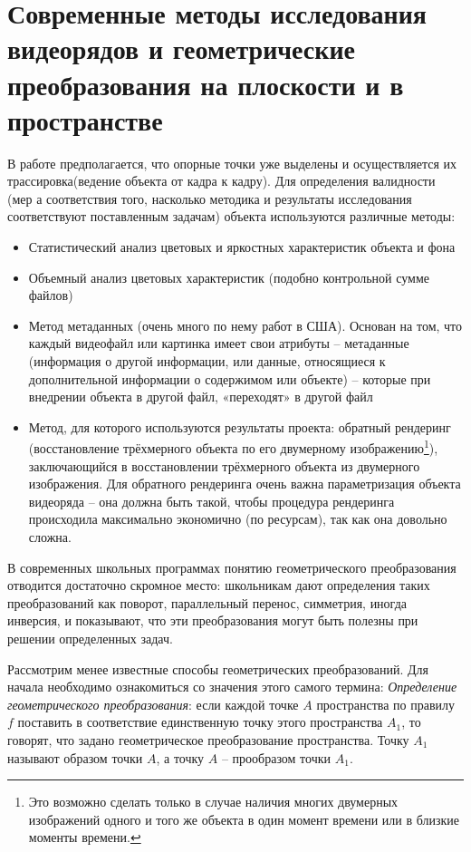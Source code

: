\documentclass[]{article}
\begin{document}
\newpage
\section{Современные методы исследования видеорядов и геометрические преобразования на плоскости и в пространстве}

В работе предполагается, что опорные точки уже выделены и осуществляется их трассировка(ведение объекта от кадра к кадру). Для определения валидности (мер а соответствия того, насколько методика и результаты исследования соответствуют поставленным задачам) объекта используются различные методы: 
\begin{itemize}[noitemsep]
	\item Статистический анализ цветовых и яркостных характеристик объекта и фона
	\item Объемный анализ цветовых характеристик (подобно контрольной сумме файлов)
	\item Метод метаданных (очень много по нему работ в США). Основан на том, что каждый видеофайл или картинка имеет свои атрибуты – метаданные (информация о другой информации, или данные, относящиеся к дополнительной информации о содержимом или объекте) – которые при внедрении объекта в другой файл, «переходят» в другой файл
	\item Метод, для которого используются результаты проекта: обратный рендеринг (восстановление трёхмерного объекта по его двумерному изображению\footnote{ Это возможно сделать только в случае наличия многих двумерных изображений одного и того же объекта в один момент времени или в близкие моменты времени.
	}), заключающийся в восстановлении трёхмерного объекта из двумерного изображения. Для обратного рендеринга очень важна параметризация объекта видеоряда – она должна быть такой, чтобы процедура рендеринга происходила максимально экономично (по ресурсам), так как она довольно сложна. 
\end{itemize}

В современных школьных программах понятию геометрического преобразования отводится достаточно скромное место: школьникам дают
определения таких преобразований как поворот, параллельный перенос,
симметрия, иногда инверсия, и показывают, что эти преобразования могут
быть полезны при решении определенных задач.

Рассмотрим менее известные способы геометрических преобразований. Для начала необходимо ознакомиться со значения этого самого термина:  
\textit{Определение геометрического преобразования}: если каждой точке $A$ пространства по правилу $f$ поставить в соответствие единственную точку этого пространства $A_1$, то говорят, что задано геометрическое преобразование пространства. Точку $A_1$ называют образом точки $A$, а точку $A$ – прообразом точки $A_1$.
\end{document}
